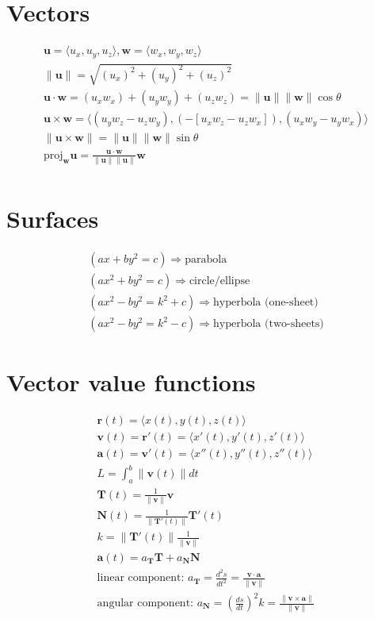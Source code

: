 \documentclass[fleqn]{article}
\renewcommand{\vec}[1]{\mathbf{#1}}
\begin{document}
\section*{Vectors}
\begin{gather*}
  \vec u=\langle u_{x},u_{y},u_{z}\rangle,\vec w=\langle w_{x},w_{y},w_{z}\rangle \\
  \|\vec u\|=\sqrt{{(u_{x})}^2+{(u_{y})}^2+{(u_{z})}^2} \\
  \vec u\cdot\vec w=(u_{x}w_x)+(u_{y}w_{y})+(u_{z}w_{z})=\|\vec u\|\|\vec w\|\cos\theta \\
  \vec u\times\vec w=\langle(u_{y}w_{z}-u_{z}w_{y}),(-[u_{x}w_{z}-u_{z}w_{x}]),(u_{x}w_{y}-u_{y}w_{x})\rangle \\
  \|\vec u\times\vec w\|=\|\vec u\|\|\vec w\|\sin\theta \\
  \text{proj}_{\vec w}\vec u=\frac{\vec u\cdot\vec w}{\|\vec u\|\|\vec u\|}\vec w \\
\end{gather*}

\section*{Surfaces}
\begin{gather*}
  (ax+by^2=c)\Rightarrow\text{parabola} \\
  (ax^2+by^2=c)\Rightarrow\text{circle/ellipse} \\
  (ax^2-by^2=k^2+c)\Rightarrow\text{hyperbola (one-sheet)} \\
  (ax^2-by^2=k^2-c)\Rightarrow\text{hyperbola (two-sheets)}
\end{gather*}

\section*{Vector value functions}
\begin{gather*}
  \vec r(t)=\langle x(t),y(t),z(t)\rangle \\
  \vec v(t)=\vec r'(t)=\langle x'(t),y'(t),z'(t)\rangle \\
  \vec a(t)=\vec v'(t)=\langle x''(t),y''(t),z''(t)\rangle \\
  L=\int_a^b\|\vec v(t)\|dt \\
  \vec T(t)=\frac{1}{\|\vec v\|}\vec v \\
  \vec N(t)=\frac{1}{\|\vec T'(t)\|}\vec T'(t) \\
  k=\left\|\vec T'(t)\right\|\frac{1}{\|\vec v\|} \\
  \vec a(t)=a_{\vec T}\vec T+a_{\vec N}\vec N \\
  \text{linear component: }a_{\vec T}=\frac{d^2s}{dt^2}=\frac{\vec v\cdot\vec a}{\|\vec v\|} \\
  \text{angular component: }a_{\vec N}={\left(\frac{ds}{dt}\right)}^2 k=\frac{\|\vec v\times\vec a\|}{\|\vec v\|}\\
\end{gather*}
\end{document}
